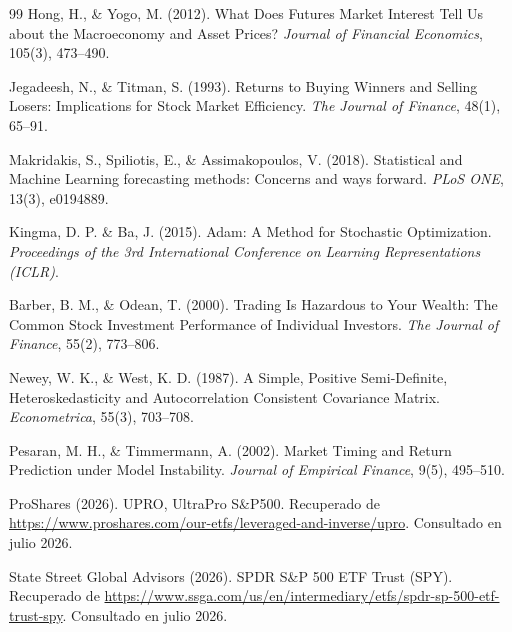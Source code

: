 ﻿\documentclass[11pt,a4paper]{article}
\begin{document}
\begin{thebibliography}{99}
Hong, H., \& Yogo, M. (2012).
\newblock What Does Futures Market Interest Tell Us about the Macroeconomy and Asset Prices?
\newblock \textit{Journal of Financial Economics}, 105(3), 473--490.

Jegadeesh, N., \& Titman, S. (1993).
\newblock Returns to Buying Winners and Selling Losers: Implications for Stock Market Efficiency.
\newblock \textit{The Journal of Finance}, 48(1), 65--91.

Makridakis, S., Spiliotis, E., \& Assimakopoulos, V. (2018).
\newblock Statistical and Machine Learning forecasting methods: Concerns and ways forward.
\newblock \textit{PLoS ONE}, 13(3), e0194889.

Kingma, D. P. \& Ba, J. (2015).
\newblock Adam: A Method for Stochastic Optimization.
\newblock \textit{Proceedings of the 3rd International Conference on Learning Representations (ICLR)}.

Barber, B. M., \& Odean, T. (2000).
\newblock Trading Is Hazardous to Your Wealth: The Common Stock Investment Performance of Individual Investors.
\newblock \textit{The Journal of Finance}, 55(2), 773--806.

Newey, W. K., \& West, K. D. (1987).
\newblock A Simple, Positive Semi-Definite, Heteroskedasticity and Autocorrelation Consistent Covariance Matrix.
\newblock \textit{Econometrica}, 55(3), 703--708.

Pesaran, M. H., \& Timmermann, A. (2002).
\newblock Market Timing and Return Prediction under Model Instability.
\newblock \textit{Journal of Empirical Finance}, 9(5), 495--510.

ProShares (2026).
\newblock UPRO, UltraPro S\&P500.
\newblock Recuperado de \url{https://www.proshares.com/our-etfs/leveraged-and-inverse/upro}. Consultado en julio 2026.

State Street Global Advisors (2026).
\newblock SPDR S\&P 500 ETF Trust (SPY).
\newblock Recuperado de \url{https://www.ssga.com/us/en/intermediary/etfs/spdr-sp-500-etf-trust-spy}. Consultado en julio 2026.

\end{thebibliography}
\end{document}
